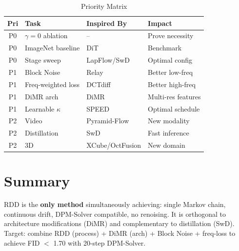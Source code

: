 \documentclass[11pt, a4paper]{article}
\begin{document}
\begin{table}[H]
\centering
\caption{Priority Matrix}
\begin{tabular}{clll}
\toprule
Pri & Task & Inspired By & Impact \\
\midrule
P0 & $\gamma=0$ ablation & -- & Prove necessity \\
P0 & ImageNet baseline & DiT & Benchmark \\
P0 & Stage sweep & LapFlow/SwD & Optimal config \\
\midrule
P1 & Block Noise & Relay & Better low-freq \\
P1 & Freq-weighted loss & DCTdiff & Better high-freq \\
P1 & DiMR arch & DiMR & Multi-res features \\
P1 & Learnable $\kappa$ & SPEED & Optimal schedule \\
\midrule
P2 & Video & Pyramid-Flow & New modality \\
P2 & Distillation & SwD & Fast inference \\
P2 & 3D & XCube/OctFusion & New domain \\
\bottomrule
\end{tabular}
\end{table}

\section*{Summary}

RDD is the \textbf{only method} simultaneously achieving: single Markov chain, continuous drift, DPM-Solver compatible, no renoising. It is orthogonal to architecture modifications (DiMR) and complementary to distillation (SwD). Target: combine RDD (process) + DiMR (arch) + Block Noise + freq-loss to achieve FID $<$ 1.70 with 20-step DPM-Solver.
\end{document}
